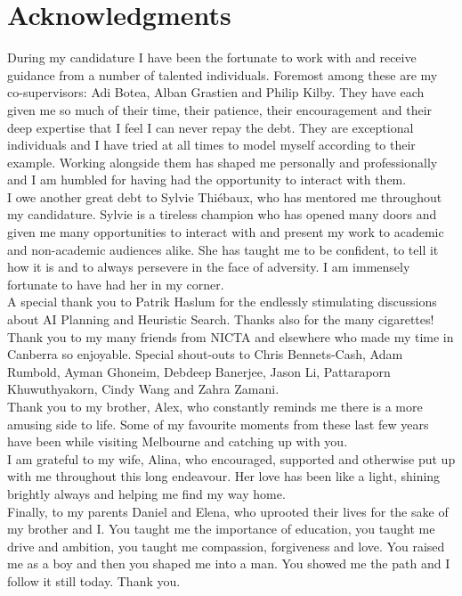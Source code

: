 \chapter*{Acknowledgments}

During my candidature I have been the fortunate to work with and receive
guidance from a number of talented individuals. 
Foremost among these are my co-supervisors: Adi Botea, 
Alban Grastien and Philip Kilby. They have each given me so much of their time, 
their patience, their encouragement and their deep expertise that 
I feel I can never repay the debt. They are exceptional individuals and
I have tried at all times to model myself according to their example.  
Working alongside them has shaped me personally and professionally and I am
humbled for having had the opportunity to interact with them.
\newline \\ 
\noindent 
I owe another great debt to Sylvie Thi{\'e}baux, who has mentored me
throughout my candidature.  Sylvie is a tireless champion who has opened many
doors and given me many opportunities to interact with and present my work to
academic and non-academic audiences alike. She has taught me to be confident,
to tell it how it is and to always persevere in the face of adversity. I am
immensely fortunate to have had her in my corner.
\newline \\ 
\noindent
A special thank you to Patrik Haslum for the endlessly stimulating discussions
about AI Planning and Heuristic Search.  Thanks also for the many cigarettes!
\newline \\ 
\noindent
Thank you to my many friends from NICTA and elsewhere who made my time in Canberra
so enjoyable. Special shout-outs to Chris Bennets-Cash, Adam Rumbold, Ayman Ghoneim, 
Debdeep Banerjee, Jason Li, Pattaraporn Khuwuthyakorn, Cindy Wang and Zahra Zamani. 
\newline \\ 
\noindent
Thank you to my brother, Alex, who constantly reminds me there is a more
amusing side to life. Some of my favourite moments from these last few years have
been while visiting Melbourne and catching up with you.
\newline \\ 
\noindent
I am grateful to my wife, Alina, who encouraged, supported and
otherwise put up with me throughout this long endeavour. Her love has been
like a light, shining brightly always and helping me find my way home.
\newline \\ 
\noindent
Finally, to my parents Daniel and Elena, who uprooted their lives for the sake
of my brother and I.  You taught me the importance of education, you taught me
drive and ambition, you taught me compassion, forgiveness and love. You raised
me as a boy and then you shaped me into a man. You showed me the path and I
follow it still today. Thank you.

